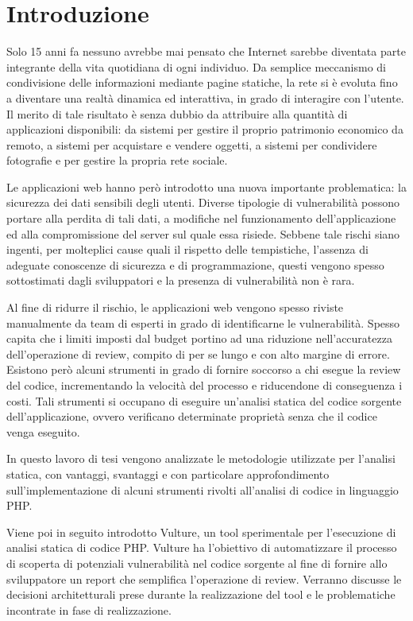 \chapter{Introduzione}
Solo 15 anni fa nessuno avrebbe mai pensato che Internet sarebbe diventata parte integrante della vita quotidiana di ogni individuo. Da semplice meccanismo di condivisione delle informazioni mediante pagine statiche, la rete si è evoluta fino a diventare una realtà dinamica ed interattiva, in grado di interagire con l'utente.
Il merito di tale risultato è senza dubbio da attribuire alla quantità di applicazioni disponibili: da sistemi per gestire il proprio patrimonio economico da remoto, a sistemi per acquistare e vendere oggetti, a sistemi per condividere fotografie e per gestire la propria rete sociale.

Le applicazioni web hanno però introdotto una nuova importante problematica: la sicurezza dei dati sensibili degli utenti. Diverse tipologie di vulnerabilità possono portare alla perdita di tali dati, a modifiche nel funzionamento dell'applicazione ed alla compromissione del server sul quale essa risiede. Sebbene tale rischi siano ingenti, per molteplici cause quali il rispetto delle tempistiche, l'assenza di adeguate conoscenze di sicurezza e di programmazione, questi vengono spesso sottostimati dagli sviluppatori e la presenza di vulnerabilità non è rara.

Al fine di ridurre il rischio, le applicazioni web vengono spesso riviste manualmente da team di esperti in grado di identificarne le vulnerabilità. Spesso capita che i limiti imposti dal budget portino ad una riduzione nell'accuratezza dell'operazione di review, compito di per se lungo e con alto margine di errore.\\
Esistono però alcuni strumenti in grado di fornire soccorso a chi esegue la review del codice, incrementando la velocità del processo e riducendone di conseguenza i costi. Tali strumenti si occupano di eseguire un'analisi statica del codice sorgente dell'applicazione, ovvero verificano determinate proprietà senza che il codice venga eseguito.

In questo lavoro di tesi vengono analizzate le metodologie utilizzate per l'analisi statica, con vantaggi, svantaggi e con particolare approfondimento sull'implementazione di alcuni strumenti rivolti all'analisi di codice in linguaggio PHP.

Viene poi in seguito introdotto Vulture, un tool sperimentale per l'esecuzione di analisi statica di codice PHP. Vulture ha l'obiettivo di automatizzare il processo di scoperta di potenziali vulnerabilità nel codice sorgente al fine di fornire allo sviluppatore un report che semplifica l'operazione di review. Verranno discusse le decisioni architetturali prese durante la realizzazione del tool e le problematiche incontrate in fase di realizzazione.